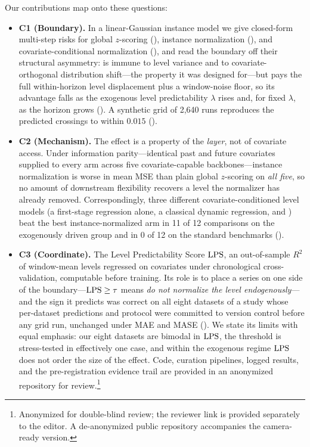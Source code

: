 Our contributions map onto these questions:
\begin{itemize}
  \item \textbf{C1 (Boundary).} In a linear-Gaussian instance model we give closed-form multi-step risks for global $z$-scoring (\rawm), instance normalization (\inm), and covariate-conditional normalization (\cnm), and read the boundary off their structural asymmetry: \inm{} is immune to level variance and to covariate-orthogonal distribution shift---the property it was designed for---but pays the full within-horizon level displacement plus a window-noise floor, so its advantage falls as the exogenous level predictability $\lambda$ rises and, for fixed $\lambda$, as the horizon grows (). A synthetic grid of 2{,}640 runs reproduces the predicted crossings to within $0.015$ ().
  \item \textbf{C2 (Mechanism).} The effect is a property of the \emph{layer}, not of covariate access. Under information parity---identical past and future covariates supplied to every arm across five covariate-capable backbones---instance normalization is worse in mean MSE than plain global $z$-scoring on \emph{all five}, so no amount of downstream flexibility recovers a level the normalizer has already removed. Correspondingly, three different covariate-conditioned level models (a first-stage regression alone, a classical dynamic regression, and \cnm) beat the best instance-normalized arm in 11 of 12 comparisons on the exogenously driven group and in 0 of 12 on the standard benchmarks ().
  \item \textbf{C3 (Coordinate).} The Level Predictability Score $\mathrm{LPS}$, an out-of-sample $R^2$ of window-mean levels regressed on covariates under chronological cross-validation, computable before training. Its role is to place a series on one side of the boundary---$\mathrm{LPS} \geq \tau$ means \emph{do not normalize the level endogenously}---and the sign it predicts was correct on all eight datasets of a study whose per-dataset predictions and protocol were committed to version control before any grid run, unchanged under MAE and MASE (). We state its limits with equal emphasis: our eight datasets are bimodal in $\mathrm{LPS}$, the threshold is stress-tested in effectively one case, and within the exogenous regime $\mathrm{LPS}$ does not order the size of the effect. Code, curation pipelines, logged results, and the pre-registration evidence trail are provided in an anonymized repository for review.\footnote{Anonymized for double-blind review; the reviewer link is provided separately to the editor. A de-anonymized public repository accompanies the camera-ready version.}
\end{itemize}

